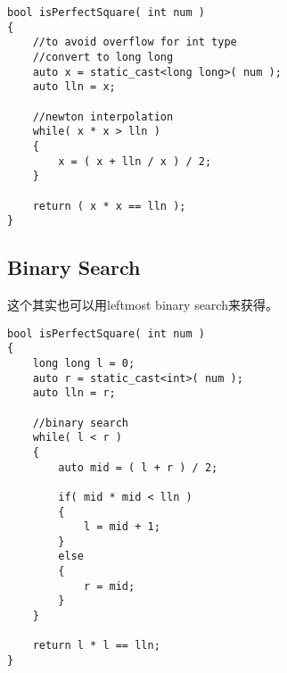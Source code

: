 \setcounter{lstlisting}{0}
\begin{lstlisting}[style=customc, caption={Newton Interpolation}]
bool isPerfectSquare( int num )
{
    //to avoid overflow for int type
    //convert to long long
    auto x = static_cast<long long>( num );
    auto lln = x;

    //newton interpolation
    while( x * x > lln )
    {
        x = ( x + lln / x ) / 2;
    }

    return ( x * x == lln );
}
\end{lstlisting}

\subsection{Binary Search}
这个其实也可以用leftmost binary search来获得。

\begin{lstlisting}[style=customc, caption={Binary Search}]
bool isPerfectSquare( int num )
{
    long long l = 0;
    auto r = static_cast<int>( num );
    auto lln = r;

    //binary search
    while( l < r )
    {
        auto mid = ( l + r ) / 2;

        if( mid * mid < lln )
        {
            l = mid + 1;
        }
        else
        {
            r = mid;
        }
    }

    return l * l == lln;
}
\end{lstlisting}
